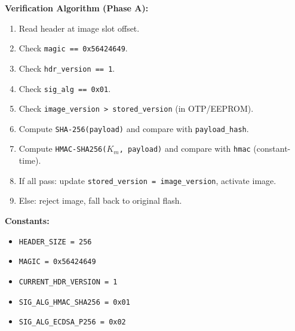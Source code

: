 \noindent\textbf{Verification Algorithm (Phase A):}
\begin{enumerate}
    \item Read header at image slot offset.
    \item Check \texttt{magic == 0x56424649}.
    \item Check \texttt{hdr\_version == 1}.
    \item Check \texttt{sig\_alg == 0x01}.
    \item Check \texttt{image\_version > stored\_version} (in OTP/EEPROM).
    \item Compute \texttt{SHA-256(payload)} and compare with \texttt{payload\_hash}.
    \item Compute \texttt{HMAC-SHA256($K_m$, payload)} and compare with \texttt{hmac} (constant-time).
    \item If all pass: update \texttt{stored\_version = image\_version}, activate image.
    \item Else: reject image, fall back to original flash.
\end{enumerate}

\noindent\textbf{Constants:}
\begin{itemize}
    \item \texttt{HEADER\_SIZE = 256}
    \item \texttt{MAGIC = 0x56424649}
    \item \texttt{CURRENT\_HDR\_VERSION = 1}
    \item \texttt{SIG\_ALG\_HMAC\_SHA256 = 0x01}
    \item \texttt{SIG\_ALG\_ECDSA\_P256 = 0x02}
\end{itemize}